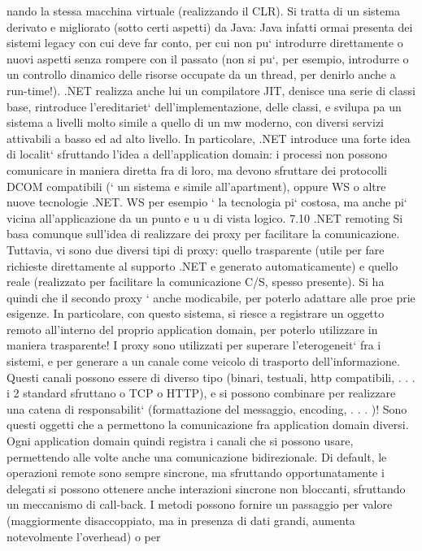 \documentclass[a4paper,12pt]{article}
\begin{document}
nando la stessa macchina virtuale (realizzando il CLR). Si tratta di un sistema
derivato e migliorato (sotto certi aspetti) da Java: Java infatti ormai presenta
dei sistemi legacy con cui deve far conto, per cui non pu` introdurre direttamente
o
nuovi aspetti senza rompere con il passato (non si pu`, per esempio, introdurre
o
un controllo dinamico delle risorse occupate da un thread, per denirlo anche a
run-time!). .NET realizza anche lui un compilatore JIT, denisce una serie di
classi base, rintroduce l'ereditariet` dell'implementazione, delle classi, e svilupa
pa un sistema a livelli molto simile a quello di un mw moderno, con diversi
servizi attivabili a basso ed ad alto livello.
In particolare, .NET introduce una forte idea di localit` sfruttando l'idea
a
dell'application domain: i processi non possono comunicare in maniera diretta
fra di loro, ma devono sfruttare dei protocolli DCOM compatibili (` un sistema
e
simile all'apartment), oppure WS o altre nuove tecnologie .NET. WS per esempio ` la tecnologia pi` costosa, ma anche pi`
vicina all'applicazione da un punto
e
u
u
di vista logico.
7.10
.NET remoting
Si basa comunque sull'idea di realizzare dei proxy per facilitare la comunicazione.
Tuttavia, vi sono due diversi tipi di proxy: quello trasparente (utile per fare
richieste direttamente al supporto .NET e generato automaticamente) e quello
reale (realizzato per facilitare la comunicazione C/S, spesso presente). Si ha
quindi che il secondo proxy ` anche modicabile, per poterlo adattare alle proe
prie esigenze. In particolare, con questo sistema, si riesce a registrare un oggetto remoto all'interno del proprio
application domain, per poterlo utilizzare in
maniera trasparente!
I proxy sono utilizzati per superare l'eterogeneit` fra i sistemi, e per generare
a
un canale come veicolo di trasporto dell'informazione. Questi canali possono essere di diverso tipo (binari, testuali,
http compatibili, . . . i 2 standard sfruttano
o TCP o HTTP), e si possono combinare per realizzare una catena di responsabilit` (formattazione del messaggio,
encoding, . . . )! Sono questi oggetti che
a
permettono la comunicazione fra application domain diversi. Ogni application
domain quindi registra i canali che si possono usare, permettendo alle volte anche una comunicazione bidirezionale.
Di default, le operazioni remote sono sempre sincrone, ma sfruttando opportunatamente i delegati si possono ottenere
anche interazioni sincrone non
bloccanti, sfruttando un meccanismo di call-back. I metodi possono fornire un
passaggio per valore (maggiormente disaccoppiato, ma in presenza di dati grandi, aumenta notevolmente l'overhead) o per
\end{document}
